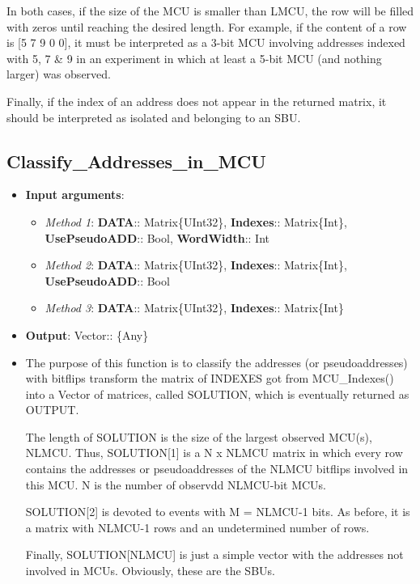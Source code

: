 \begin{itemize}
     In both cases, if the size of the MCU is smaller than LMCU, the row will be filled with zeros until
     reaching the desired length. For example, if the content of a row is [5 7 9 0 0], it must be interpreted
     as a 3-bit MCU involving addresses indexed with 5, 7 \& 9 in an experiment in which at least a 5-bit 
     MCU (and nothing larger) was observed.
     
 	Finally, if the index of an address does not appear in the returned matrix, it should be interpreted as  isolated and belonging to an SBU.
 	
 \end{itemize}
%
\subsection*{Classify\_Addresses\_in\_MCU}
%
\begin{itemize}
	\item \textbf{Input arguments}: 
		\begin{itemize}
			\item \textit{Method 1}: \textbf{DATA}:: Matrix\{UInt32\}, 
			\textbf{Indexes}:: Matrix\{Int\}, 
			\textbf{UsePseudoADD}:: Bool, 
			\textbf{WordWidth}:: Int
			\item \textit{Method 2}: \textbf{DATA}:: Matrix\{UInt32\}, 
			\textbf{Indexes}:: Matrix\{Int\}, 
			\textbf{UsePseudoADD}:: Bool 
			\item \textit{Method 3}: \textbf{DATA}:: Matrix\{UInt32\}, 
			\textbf{Indexes}:: Matrix\{Int\}
		\end{itemize}
	\item \textbf{Output}: Vector:: \{Any\}
	\item The purpose of this function is to classify the addresses (or pseudoaddresses) with bitflips transform the matrix of INDEXES got from MCU\_Indexes() into a Vector of matrices, called SOLUTION, which is eventually returned as OUTPUT.
	 
	The length of SOLUTION is the size of the largest observed MCU(s), NLMCU. Thus, SOLUTION[1] is 	a N x NLMCU matrix in which every row contains the addresses or pseudoaddresses of the NLMCU 	bitflips involved in this MCU. N is the number of observdd NLMCU-bit MCUs.
	
	SOLUTION[2] is devoted to events with M = NLMCU-1 bits. As before, it is a matrix with NLMCU-1 	rows and an undetermined number of rows.
	
	Finally, SOLUTION[NLMCU] is just a simple vector with the addresses not involved in MCUs. Obviously, these are the SBUs.
\end{itemize}

